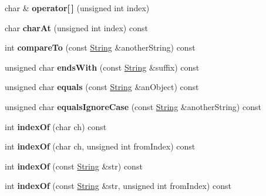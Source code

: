 \begin{DoxyCompactItemize}
\item 
\hypertarget{classString_a92a0681d0031d7e99c12c245cc22367e}{
char \& {\bfseries operator\mbox{[}$\,$\mbox{]}} (unsigned int index)}
\label{classString_a92a0681d0031d7e99c12c245cc22367e}

\item 
\hypertarget{classString_acead06863849178bb7feb0dae0c5d595}{
char {\bfseries char\-At} (unsigned int index) const }
\label{classString_acead06863849178bb7feb0dae0c5d595}

\item 
\hypertarget{classString_a1ed648fc6f54ab9e99fae08991675c77}{
int {\bfseries compare\-To} (const \hyperlink{classString}{\-String} \&another\-String) const }
\label{classString_a1ed648fc6f54ab9e99fae08991675c77}

\item 
\hypertarget{classString_a4f2b8d633c6f91309ebd315199a2d2b8}{
unsigned char {\bfseries ends\-With} (const \hyperlink{classString}{\-String} \&suffix) const }
\label{classString_a4f2b8d633c6f91309ebd315199a2d2b8}

\item 
\hypertarget{classString_a0f25dc8c00c27db4eb0deb713cbf5152}{
unsigned char {\bfseries equals} (const \hyperlink{classString}{\-String} \&an\-Object) const }
\label{classString_a0f25dc8c00c27db4eb0deb713cbf5152}

\item 
\hypertarget{classString_ae2cd256105577f22724d1eaff0431aaa}{
unsigned char {\bfseries equals\-Ignore\-Case} (const \hyperlink{classString}{\-String} \&another\-String) const }
\label{classString_ae2cd256105577f22724d1eaff0431aaa}

\item 
\hypertarget{classString_a798dc000292a549eca982a3a5e2de54a}{
int {\bfseries index\-Of} (char ch) const }
\label{classString_a798dc000292a549eca982a3a5e2de54a}

\item 
\hypertarget{classString_a3cce8cd1ed439561aa25df6c546045d5}{
int {\bfseries index\-Of} (char ch, unsigned int from\-Index) const }
\label{classString_a3cce8cd1ed439561aa25df6c546045d5}

\item 
\hypertarget{classString_ae1ceec091fbce68e360c1e0717d50f28}{
int {\bfseries index\-Of} (const \hyperlink{classString}{\-String} \&str) const }
\label{classString_ae1ceec091fbce68e360c1e0717d50f28}

\item 
\hypertarget{classString_a97998ed753b0445123cc17449adb6e9a}{
int {\bfseries index\-Of} (const \hyperlink{classString}{\-String} \&str, unsigned int from\-Index) const }
\label{classString_a97998ed753b0445123cc17449adb6e9a}


\end{DoxyCompactItemize}
